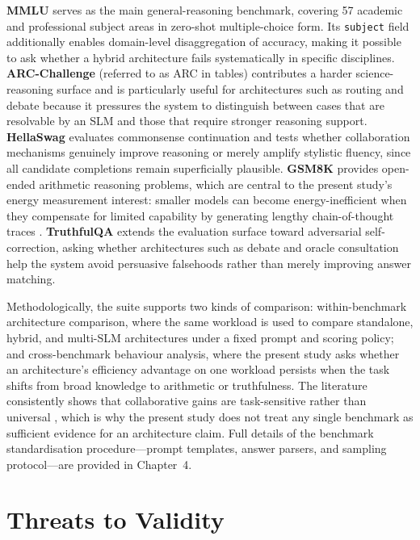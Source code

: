 \textbf{MMLU} \cite{hendrycks2021mmlu} serves as the main general-reasoning benchmark, covering 57 academic and professional subject areas in zero-shot multiple-choice form. Its \texttt{subject} field additionally enables domain-level disaggregation of accuracy, making it possible to ask whether a hybrid architecture fails systematically in specific disciplines. \textbf{ARC-Challenge} \cite{clark2018arc} (referred to as ARC in tables) contributes a harder science-reasoning surface and is particularly useful for architectures such as routing and debate because it pressures the system to distinguish between cases that are resolvable by an SLM and those that require stronger reasoning support. \textbf{HellaSwag} \cite{zellers2019hellaswag} evaluates commonsense continuation and tests whether collaboration mechanisms genuinely improve reasoning or merely amplify stylistic fluency, since all candidate completions remain superficially plausible. \textbf{GSM8K} \cite{cobbe2021gsm8k} provides open-ended arithmetic reasoning problems, which are central to the present study's energy measurement interest: smaller models can become energy-inefficient when they compensate for limited capability by generating lengthy chain-of-thought traces \cite{energytoken2025}. \textbf{TruthfulQA} \cite{lin2022truthfulqa} extends the evaluation surface toward adversarial self-correction, asking whether architectures such as debate and oracle consultation help the system avoid persuasive falsehoods rather than merely improving answer matching.

Methodologically, the suite supports two kinds of comparison: within-benchmark architecture comparison, where the same workload is used to compare standalone, hybrid, and multi-SLM architectures under a fixed prompt and scoring policy; and cross-benchmark behaviour analysis, where the present study asks whether an architecture's efficiency advantage on one workload persists when the task shifts from broad knowledge to arithmetic or truthfulness. The literature consistently shows that collaborative gains are task-sensitive rather than universal \cite{slrmanuscript2026, debateagents2025, sentensemble2026}, which is why the present study does not treat any single benchmark as sufficient evidence for an architecture claim. Full details of the benchmark standardisation procedure---prompt templates, answer parsers, and sampling protocol---are provided in Chapter~4.

\section{Threats to Validity}
\label{sec:threats}

